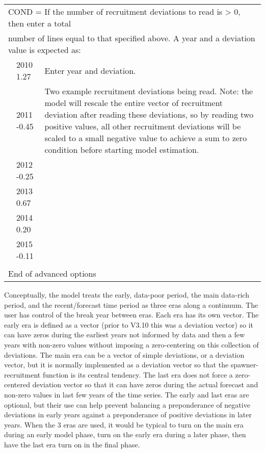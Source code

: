 \begin{longtable}{p{1cm} p{3cm} p{12cm}}
	\multicolumn{3}{l}{COND = If the number of recruitment deviations to read is > 0, then enter a total} \Tstrut\\
	\multicolumn{3}{l}{number of lines equal to that specified above. A year and a deviation value is expected as:} \Bstrut\\
	& 2010 1.27 & Enter year and deviation. \\
	& 2011 -0.45 & \multirow{1}{1cm}[-0.25cm]{\parbox{10cm}{Two example recruitment deviations being read. Note: the model will rescale the entire vector of recruitment deviation after reading these deviations, so by reading two positive values, all other recruitment deviations will be scaled to a small negative value to achieve a sum to zero condition before starting model estimation.}} \\
	& 2012 -0.25 & \\
	& 2013 0.67 & \\
	& 2014 0.20 & \\
	& 2015 -0.11 & \\
	& & \\
	\hline
	
		
	\multicolumn{3}{l}{End of advanced options} \Tstrut\Bstrut\\
	\hline
	
\end{longtable}

Conceptually, the model treats the early, data-poor period, the main data-rich period, and the recent/forecast time period as three eras along a continuum. The user has control of the break year between eras. Each era has its own vector. The early era is defined as a vector (prior to V3.10 this was a deviation vector) so it can have zeros during the earliest years not informed by data and then a few years with non-zero values without imposing a zero-centering on this collection of deviations. The main era can be a vector of simple deviations, or a deviation vector, but it is normally implemented as a deviation vector so that the spawner-recruitment function is its central tendency. The last era does not force a zero-centered deviation vector so that it can have zeros during the actual forecast and non-zero values in last few years of the time series. The early and last eras are optional, but their use can help prevent balancing a preponderance of negative deviations in early years against a preponderance of positive deviations in later years. When the 3 eras are used, it would be typical to turn on the main era during an early model phase, turn on the early era during a later phase, then have the last era turn on in the final phase.

